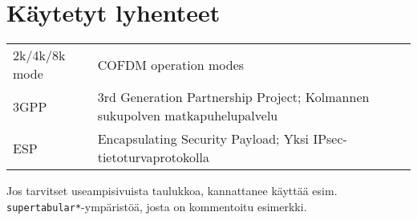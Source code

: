 %
%
%
\section*{Käytetyt lyhenteet}

\begin{tabular}{p{}p{}}
2k/4k/8k mode & COFDM operation modes \\
3GPP  & 3rd Generation Partnership Project; Kolmannen sukupolven 
matkapuhelupalvelu \\ 
ESP & Encapsulating Security Payload; Yksi IPsec-tietoturvaprotokolla \\ 
\end{tabular}

Jos tarvitset useampisivuista taulukkoa, kannattanee käyttää 
esim. \verb!supertabular*!-ympäristöä, josta on kommentoitu esimerkki.


